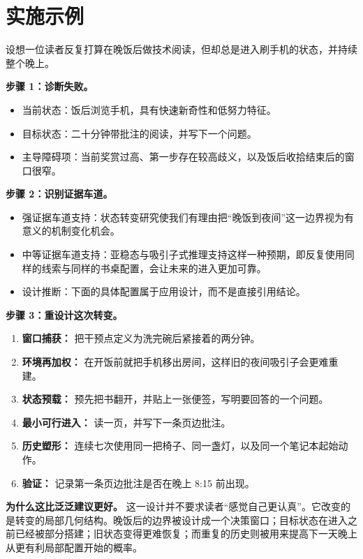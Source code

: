 \section{实施示例}

\begin{example}[把晚饭后的学习重建为一种转变设计]
设想一位读者反复打算在晚饭后做技术阅读，但却总是进入刷手机的状态，并持续整个晚上。

\textbf{步骤 1：诊断失败。}
\begin{itemize}[nosep]
  \item 当前状态：饭后浏览手机，具有快速新奇性和低努力特征。
  \item 目标状态：二十分钟带批注的阅读，并写下一个问题。
  \item 主导障碍项：当前奖赏过高、第一步存在较高歧义，以及饭后收拾结束后的窗口很窄。
\end{itemize}

\textbf{步骤 2：识别证据车道。}
\begin{itemize}[nosep]
  \item 强证据车道支持：状态转变研究使我们有理由把“晚饭到夜间”这一边界视为有意义的机制变化机会。
  \item 中等证据车道支持：亚稳态与吸引子式推理支持这样一种预期，即反复使用同样的线索与同样的书桌配置，会让未来的进入更加可靠。
  \item 设计推断：下面的具体配置属于应用设计，而不是直接引用结论。
\end{itemize}

\textbf{步骤 3：重设计这次转变。}
\begin{enumerate}[nosep]
  \item \textbf{窗口捕获：} 把干预点定义为洗完碗后紧接着的两分钟。
  \item \textbf{环境再加权：} 在开饭前就把手机移出房间，这样旧的夜间吸引子会更难重建。
  \item \textbf{状态预载：} 预先把书翻开，并贴上一张便签，写明要回答的一个问题。
  \item \textbf{最小可行进入：} 读一页，并写下一条页边批注。
  \item \textbf{历史塑形：} 连续七次使用同一把椅子、同一盏灯，以及同一个笔记本起始动作。
  \item \textbf{验证：} 记录第一条页边批注是否在晚上 8:15 前出现。
\end{enumerate}

\textbf{为什么这比泛泛建议更好。}
这一设计并不要求读者“感觉自己更认真”。它改变的是转变的局部几何结构。晚饭后的边界被设计成一个决策窗口；目标状态在进入之前已经被部分搭建；旧状态变得更难恢复；而重复的历史则被用来提高下一天晚上从更有利局部配置开始的概率。
\end{example}